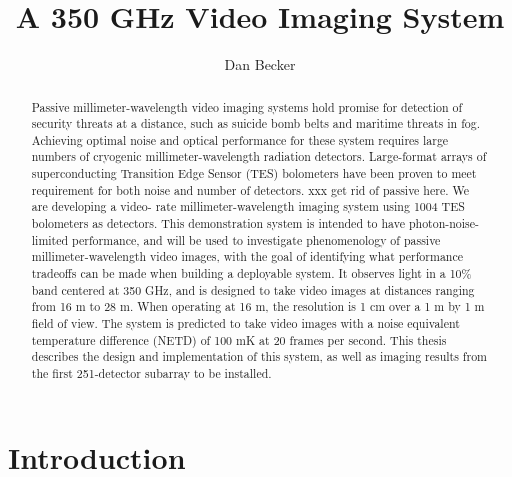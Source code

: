 \documentclass[12pt,letterpaper]{memoir}
\title{A 350 GHz Video Imaging System}
\author{Dan Becker}
\numberwithin{equation}{chapter}
\numberwithin{figure}{chapter}
\numberwithin{table}{chapter}
\begin{document}
\maketitle

\frontmatter

\begin{abstract}
Passive millimeter-wavelength video imaging systems hold promise for detection of security threats at a distance, such as suicide bomb belts and maritime threats in fog.
Achieving optimal noise and optical performance for these system requires large numbers of cryogenic millimeter-wavelength radiation detectors. Large-format arrays of superconducting Transition Edge Sensor (TES) bolometers have been proven to meet requirement for both noise and number of detectors. xxx get rid of passive here.
We are developing a video- rate millimeter-wavelength imaging system using 1004 TES bolometers as detectors.
This demonstration system is intended to have photon-noise-limited performance, and will be used to investigate phenomenology of passive millimeter-wavelength video images, with the goal of identifying what performance tradeoffs can be made when building a deployable system.
It observes light in a 10\% band centered at 350 GHz, and is designed to take video images at distances ranging from 16 m to 28 m.
When operating at 16 m, the resolution is 1 cm over a 1 m by 1 m field of view.
The system is predicted to take video images with a noise equivalent temperature difference (NETD) of 100 mK at 20 frames per second.
This thesis describes the design and implementation of this system, as well as imaging results from the first 251-detector subarray to be installed.
\end{abstract}

\newpage

\tableofcontents* %

\clearpage
\listoftables

\clearpage
\listoffigures

\mainmatter

\chapter{Introduction}\label{c:intro}


\end{document}
